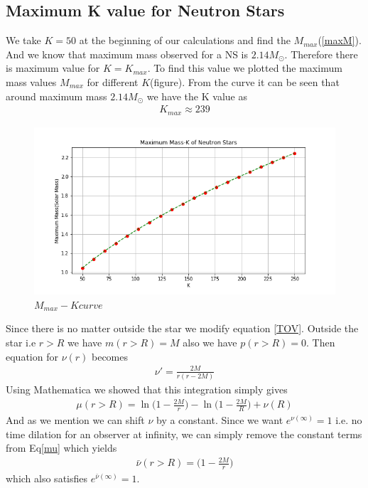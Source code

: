 \documentclass[aps,twocolumn,showpacs,preprintnumbers,nofootinbib,prl,superscriptaddress,groupedaddress]{revtex4-1}
\begin{document}
\subsection{Maximum K value for Neutron Stars}

We take $ K=50 $ at the beginning of our calculations and find the $ M_{max} $(\ref{maxM}). And we know that maximum mass observed for a NS is $ 2.14M_\odot $. Therefore there is maximum value for $K = K_{max}$. To find this value we plotted the maximum mass values $M_{max}$ for different $K$(figure). From the curve it can be seen that around maximum mass $ 2.14M_\odot $ we have the K value as
\begin{align}
	K_{max} \approx 239
\end{align}
\begin{figure}
	\centering
	\includegraphics[width=1\linewidth]{"Figures/Figures_Einstein/Max Mass - K"}
	\caption{$M_{max} - K curve$}
	\label{fig:max-mass---k}
\end{figure}

Since there is no matter outside the star we modify equation \ref{TOV}. Outside the star i.e $r>R$ we have $m(r>R) = M$ also we have $p(r>R) = 0$. Then equation for $\nu(r)$ becomes
\begin{align}
	\nu' = \frac{2M}{r(r-2M)}
\end{align}
Using Mathematica we showed that this integration simply gives
\begin{align}\label{mu}
	\mu(r>R) = \ln\bigg( 1 - \frac{2M}{r} \bigg) - \ln\bigg( 1 - \frac{2M}{R} \bigg) + \nu(R) 
\end{align}
And as we mention we can shift $\nu$ by a constant. Since we want $ e^{\nu(\infty)} = 1 $ i.e. no time dilation for an observer at infinity, we can simply remove the constant terms from Eq\ref{mu} which yields
\begin{align}
	\bar{\nu}(r>R) = \bigg(1 - \frac{2M}{r}\bigg) 
\end{align}
which also satisfies $ e^{\bar{\nu}(\infty)} = 1 $.
\end{document}

